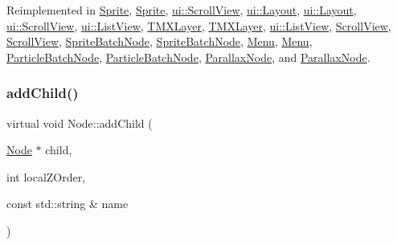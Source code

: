 Reimplemented in \hyperlink{classSprite_af91733127ca0e09dd0a36c78c62ff099}{Sprite}, \hyperlink{classSprite_aad4985d58ef1bcd5bb0a21ad0601ebce}{Sprite}, \hyperlink{classui_1_1ScrollView_ad0b88c4c9c3b6579167a115cd72d4d56}{ui\+::\+Scroll\+View}, \hyperlink{classui_1_1Layout_af456e16a833450c52982b487d97b7134}{ui\+::\+Layout}, \hyperlink{classui_1_1Layout_a26b16c7813db3140be62bad81c20a1f1}{ui\+::\+Layout}, \hyperlink{classui_1_1ScrollView_a1843e13af3409763de103e52eb28f3bd}{ui\+::\+Scroll\+View}, \hyperlink{classui_1_1ListView_aee4869d9b2ca6d88b5075f9078853644}{ui\+::\+List\+View}, \hyperlink{classTMXLayer_a6967088f51d0ad613c639b2592692116}{T\+M\+X\+Layer}, \hyperlink{classTMXLayer_a8f537dd4690c31ee1a61413c9bfcaa94}{T\+M\+X\+Layer}, \hyperlink{classui_1_1ListView_a9963ad5969a99d1e67694cfb926f56cc}{ui\+::\+List\+View}, \hyperlink{classScrollView_a251eb14f9abefa4c10ab4d0602b107c1}{Scroll\+View}, \hyperlink{classScrollView_a36cedf4f110c025a6fc1196f6db3cd44}{Scroll\+View}, \hyperlink{classSpriteBatchNode_a512bd0b1e1bd2741a99bff3997fcbbd6}{Sprite\+Batch\+Node}, \hyperlink{classSpriteBatchNode_a4d84535b9cdc98d8cfbb8d978f84fc93}{Sprite\+Batch\+Node}, \hyperlink{classMenu_aa28d64c32649091ea83bf2da673f8bdf}{Menu}, \hyperlink{classMenu_a540593eb7fb7de286fe64d6da9c67618}{Menu}, \hyperlink{classParticleBatchNode_aeaefc79b9a891df138679763791b5ac1}{Particle\+Batch\+Node}, \hyperlink{classParticleBatchNode_ae64b2ef0a26f90c90b7afd090ea12825}{Particle\+Batch\+Node}, \hyperlink{classParallaxNode_a5af09336b4d7f4d25f12d7ddf42a5a9c}{Parallax\+Node}, and \hyperlink{classParallaxNode_ad6094cbe40bd10724b586e136edfed4b}{Parallax\+Node}.

\mbox{\label{classNode_ae96fa155c63a5dc57e3fc89d5488c036}} 
\subsubsection{\texorpdfstring{add\+Child()}{addChild()}\hspace{0.1cm}{\footnotesize\ttfamily [8/8]}}
{\footnotesize\ttfamily virtual void Node\+::add\+Child (\begin{DoxyParamCaption}\item[{\hyperlink{classNode}{Node} $\ast$}]{child,  }\item[{int}]{local\+Z\+Order,  }\item[{const std\+::string \&}]{name }\end{DoxyParamCaption})\hspace{0.3cm}{\ttfamily [virtual]}}

